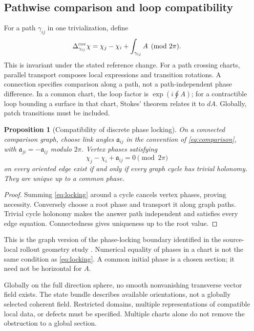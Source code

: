 \documentclass[11pt]{article}
\newtheorem{proposition}{Proposition}
\begin{document}
\subsection{Pathwise comparison and loop compatibility}

For a path $\gamma_{ij}$ in one trivialization, define
\begin{equation}
 \Delta^{\rm cov}_{\gamma_{ij}}\chi
 =\chi_j-\chi_i+\int_{\gamma_{ij}}A
 \pmod{2\pi}.
 \label{eq:comparison}
\end{equation}
This is invariant under the stated reference change. For a path crossing charts, parallel transport composes local expressions and transition rotations. A connection specifies comparison along a path, not a path-independent phase difference. In a common chart, the loop factor is $\exp(i\oint A)$; for a contractible loop bounding a surface in that chart, Stokes' theorem relates it to $dA$. Globally, patch transitions must be included.

\begin{proposition}[Compatibility of discrete phase locking]
On a connected comparison graph, choose link angles $\mathfrak a_{ij}$ in the convention of \eqref{eq:comparison}, with $\mathfrak a_{ji}=-\mathfrak a_{ij}$ modulo $2\pi$. Vertex phases satisfying
\begin{equation}
 \chi_j-\chi_i+\mathfrak a_{ij}=0\pmod{2\pi}
 \label{eq:locking}
\end{equation}
on every oriented edge exist if and only if every graph cycle has trivial holonomy. They are unique up to a common phase.
\end{proposition}
\begin{proof}
Summing \eqref{eq:locking} around a cycle cancels vertex phases, proving necessity. Conversely choose a root phase and transport it along graph paths. Trivial cycle holonomy makes the answer path independent and satisfies every edge equation. Connectedness gives uniqueness up to the root value.
\end{proof}
This is the graph version of the phase-locking boundary identified in the source-local rollout geometry study \cite{WuGeometry}. Numerical equality of phases in a chart is not the same condition as \eqref{eq:locking}. A common initial phase is a chosen section; it need not be horizontal for $A$.

Globally on the full direction sphere, no smooth nonvanishing transverse vector field exists. The state bundle describes available orientations, not a globally selected coherent field. Restricted domains, multiple representations of compatible local data, or defects must be specified. Multiple charts alone do not remove the obstruction to a global section.
\end{document}
